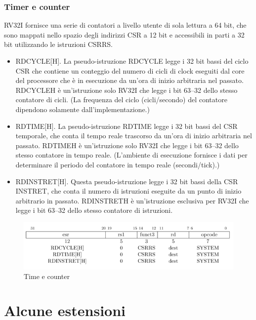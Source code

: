 \documentclass[12pt,a4paper]{report}
\begin{document}
\subsubsection{Timer e counter}
RV32I fornisce una serie di contatori a livello utente di sola lettura a 64 bit, che sono mappati nello spazio degli indirizzi CSR a 12 bit e accessibili in parti a 32 bit utilizzando le istruzioni CSRRS.
\begin{itemize}
	\item RDCYCLE[H]. La pseudo-istruzione RDCYCLE legge i 32 bit bassi del ciclo CSR che contiene un conteggio del numero di cicli di clock eseguiti dal core del processore che è in esecuzione da un'ora di inizio arbitraria nel passato. RDCYCLEH è un'istruzione solo RV32I che legge i bit 63–32 dello stesso contatore di cicli. (La frequenza del ciclo (cicli/secondo) del contatore dipendono solamente dall'implementazione.)
	\item RDTIME[H]. La pseudo-istruzione RDTIME legge i 32 bit bassi del CSR temporale, che conta il tempo reale trascorso da un'ora di inizio arbitraria nel passato. RDTIMEH è un'istruzione solo RV32I che legge i bit 63–32 dello stesso contatore in tempo reale. (L'ambiente di esecuzione fornisce i dati per determinare il periodo del contatore in tempo reale (secondi/tick).)
	\item  RDINSTRET[H]. Questa pseudo-istruzione legge i 32 bit bassi della CSR INSTRET, che conta il numero di istruzioni eseguite da un punto di inizio arbitrario in passato. RDINSTRETH è un'istruzione esclusiva per RV32I che legge i bit 63–32 dello stesso contatore di istruzioni.
\end{itemize}

\begin{figure}
	\includegraphics[width = \textwidth]{Istruzioni/Istruction10.png}
	\caption{Time e counter}
	\label{Fig:Istruzioni_TimerCounter}
\end{figure}

\section{Alcune estensioni}
\end{document}
